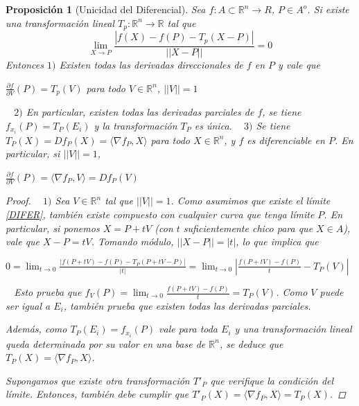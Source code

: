 \documentclass[]{article}
\newtheorem{prop}[teo]{Proposición}
\def\R{\mathbb{R}}
\newcommand{\ip}[2]{\langle #1,#2 \rangle}
\begin{document}
\begin{prop}[Unicidad del Diferencial]
	Sea $f:A\subset \R^n \to R$, $P \in A^o$. Si existe una transformación lineal $T_p:\R^n \to \R$ tal que 
	\begin{equation}\label{DIFER}
		\displaystyle \lim_{X\to P} \frac{|f(X)-f(P)-T_p(X-P)|}{||X-P||} = 0
	\end{equation}
	Entonces\newline
	$1)$ Existen todas las derivadas direccionales de $f$ en $P$ y vale que
	\begin{center}
		$\displaystyle \frac{\partial f}{\partial V}(P) = T_p(V)$ para todo $V\in \R^n$, $||V||=1$
	\end{center}
	~\newline
	$2)$ En particular, existen todas las derivadas parciales de $f$, se tiene $f_{x_i}(P)=T_P(E_i)$ y la transformación $T_P$ es única.
	~\newline
	$3)$ Se tiene $T_P(X) = Df_P(X) = \ip{\nabla f_P}{X}$ para todo $X\in \R^n$, y $f$ es diferenciable en $P$. En particular, si $||V||=1$,
	\begin{center}
		$\displaystyle \frac{\partial f}{\partial V}(P) = \ip{\nabla f_P}{V} = Df_P(V)$
	\end{center}
	\begin{proof}
		~\newline
		$1)$ Sea $V\in \R^n$ tal que $||V||=1$. Como asumimos que existe el límite \eqref{DIFER}, también existe compuesto con cualquier curva que tenga límite $P$. En particular, si ponemos $X = P + tV$ (con $t$ suficientemente chico para que $X\in A$), vale que $X-P = tV$. Tomando módulo, $||X-P|| = |t|$, lo que implica que
		\begin{center}
			$\displaystyle 0 = \lim_{t\to 0} \frac{|f(P+tV) - f(P) - T_P(P+tV-P)|}{|t|} = \lim_{t \to 0} |\frac{f(P+tV) - f(P)}{t}-T_P(V)|$
		\end{center}
		~\newline
		Esto prueba que $f_V(P) = \displaystyle \lim_{t\to 0} \frac{f(P+tV)-f(P)}{t} = T_P(V)$. Como $V$ puede ser igual a $E_i$, también prueba que existen todas las derivadas parciales. \newline
		
		Además, como $T_P(E_i) = f_{x_i}(P)$ vale para toda $E_i$ y una transformación lineal queda determinada por su valor en una base de $\R^n$, se deduce que $T_P(X) = \ip{\nabla f_P}{X}$.\newline
		
		Supongamos que existe otra transformación $T'_P$ que verifique la condición del límite. Entonces, también debe cumplir que $T'_P(X) = \ip{\nabla f_P}{X} = T_P(X)$.\newline
		
	\end{proof}
\end{prop}
\end{document}
